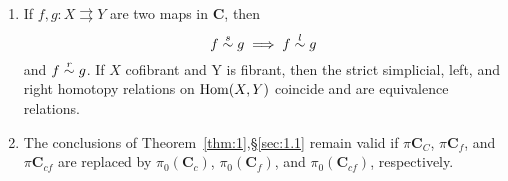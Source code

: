 \documentclass[../main]{subfiles}
\begin{document}
\begin{proposition}\label{prop:2.2.5}
    \begin{enumerate}[label = (\arabic*)]
        \item If $f,g \colon X \rightrightarrows Y$ are two maps in $\mathbf{C}$, then \
        \[f \overset{s}{\sim} g \implies f \overset{l}{\sim} g\] and $f \overset{r}{\sim} g$. If $X$ cofibrant and Y is fibrant, then the strict simplicial, left, and right homotopy relations on $\operatorname{Hom}(X,Y)$ coincide and are equivalence relations.
        \item The conclusions of Theorem~\ref{thm:1},\S\ref{sec:1.1} remain valid if $\pi \mathbf{C}_C$, $\pi \mathbf{C}_f$, and $\pi \mathbf{C}_{cf}$ are replaced by $\pi_0(\mathbf{C}_c)$, $\pi_0(\mathbf{C}_f)$, and $\pi_0(\mathbf{C}_{cf})$, respectively. 
    \end{enumerate}
\end{proposition}
\end{document}
